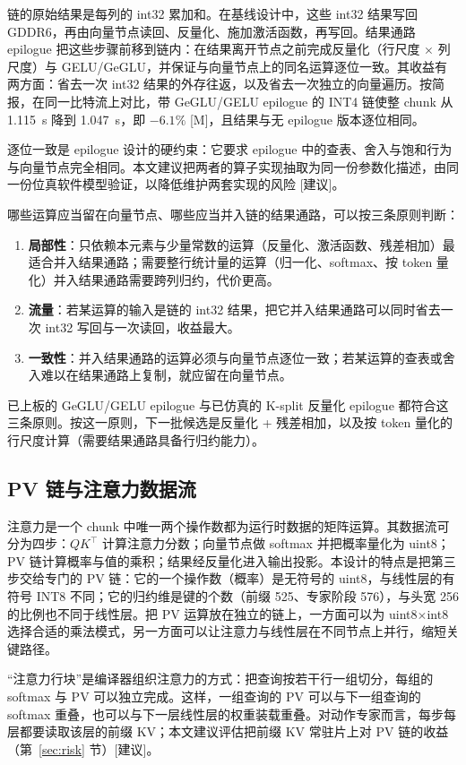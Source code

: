 \documentclass[a4paper,10.5pt]{ctexart}
\newcommand{\tM}{\textsf{[M]}}              %
\newcommand{\tR}{\textsf{[建议]}}           %
\begin{document}
链的原始结果是每列的 int32 累加和。在基线设计中，这些 int32 结果写回 GDDR6，再由向量节点读回、反量化、施加激活函数，再写回。结果通路 epilogue 把这些步骤前移到链内：在结果离开节点之前完成反量化（行尺度 $\times$ 列尺度）与 GELU/GeGLU，并保证与向量节点上的同名运算逐位一致。其收益有两方面：省去一次 int32 结果的外存往返，以及省去一次独立的向量遍历。按简报，在同一比特流上对比，带 GeGLU/GELU epilogue 的 INT4 链使整 chunk 从 1.115~s 降到 1.047~s，即 $-6.1\%$ \tM，且结果与无 epilogue 版本逐位相同。

逐位一致是 epilogue 设计的硬约束：它要求 epilogue 中的查表、舍入与饱和行为与向量节点完全相同。本文建议把两者的算子实现抽取为同一份参数化描述，由同一份位真软件模型验证，以降低维护两套实现的风险 \tR。

哪些运算应当留在向量节点、哪些应当并入链的结果通路，可以按三条原则判断：
\begin{enumerate}
  \item \textbf{局部性}：只依赖本元素与少量常数的运算（反量化、激活函数、残差相加）最适合并入结果通路；需要整行统计量的运算（归一化、softmax、按 token 量化）并入结果通路需要跨列归约，代价更高。
  \item \textbf{流量}：若某运算的输入是链的 int32 结果，把它并入结果通路可以同时省去一次 int32 写回与一次读回，收益最大。
  \item \textbf{一致性}：并入结果通路的运算必须与向量节点逐位一致；若某运算的查表或舍入难以在结果通路上复制，就应留在向量节点。
\end{enumerate}
已上板的 GeGLU/GELU epilogue 与已仿真的 K-split 反量化 epilogue 都符合这三条原则。按这一原则，下一批候选是反量化 + 残差相加，以及按 token 量化的行尺度计算（需要结果通路具备行归约能力）。

\subsection{PV 链与注意力数据流}

注意力是一个 chunk 中唯一两个操作数都为运行时数据的矩阵运算。其数据流可分为四步：$QK^\top$ 计算注意力分数；向量节点做 softmax 并把概率量化为 uint8；PV 链计算概率与值的乘积；结果经反量化进入输出投影。本设计的特点是把第三步交给专门的 PV 链：它的一个操作数（概率）是无符号的 uint8，与线性层的有符号 INT8 不同；它的归约维是键的个数（前缀 525、专家阶段 576），与头宽 256 的比例也不同于线性层。把 PV 运算放在独立的链上，一方面可以为 uint8$\times$int8 选择合适的乘法模式，另一方面可以让注意力与线性层在不同节点上并行，缩短关键路径。

“注意力行块”是编译器组织注意力的方式：把查询按若干行一组切分，每组的 softmax 与 PV 可以独立完成。这样，一组查询的 PV 可以与下一组查询的 softmax 重叠，也可以与下一层线性层的权重装载重叠。对动作专家而言，每步每层都要读取该层的前缀 KV；本文建议评估把前缀 KV 常驻片上对 PV 链的收益（第~\ref{sec:risk} 节）\tR。
\end{document}
